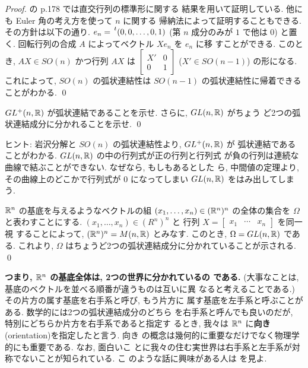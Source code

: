 \documentclass[12pt,twoside]{jarticle}
\begin{document}
\begin{proof}
\cite{Satake} の p.178 では直交行列の標準形に関する
結果を用いて証明している. 他にも Euler 角の考え方を使って $n$ に関する
帰納法によって証明することもできる. その方針は以下の通り. %
$e_n = \transpose(0,0,\dots,0,1)$ (第 $n$ 成分のみが $1$ で他は $0$)
と置く. 回転行列の合成 $A$ によってベクトル $X e_n$ を $e_n$ に移
すことができる. このとき, $AX \in SO(n)$ かつ行列 $AX$ は %
\(\displaystyle \begin{bmatrix}X'&0\\0&1\end{bmatrix} \) %
($X' \in SO(n-1)$) の形になる. これによって, $SO(n)$ の弧状連結性は %
$SO(n-1)$ の弧状連結性に帰着できることがわかる.
\qed
\end{proof}

\begin{question}
  $GL^+(n,{\mathbb R})$ が弧状連結であることを示せ. さらに, $GL(n,{\mathbb R})$ がちょう
  ど2つの弧状連結成分に分かれることを示せ. \qed
\end{question}

\noindent ヒント: 岩沢分解と $SO(n)$ の弧状連結性より, $GL^+(n,{\mathbb R})$ が
弧状連結であることがわかる. $GL(n,{\mathbb R})$ の中の行列式が正の行列と行列式
が負の行列は連続な曲線で結ぶことができない. なぜなら, もしもあるとした
ら, 中間値の定理より, その曲線上のどこかで行列式が 0 になってしまい 
$GL(n,{\mathbb R})$ をはみ出してしまう.

\begin{question}
  ${\mathbb R}^n$ の基底を与えるようなベクトルの組 $(x_1,\dots,x_n)\in ({\mathbb R}^n)^n$ %
  の全体の集合を $\Omega$ と表わすことにする. %
  $(x_1,\dots,x_n)\in (R^n)^n$ と%
  行列 $X = \begin{bmatrix} x_1 & \cdots & x_n \end{bmatrix}$ を同一視
  することによって, $({\mathbb R}^n)^n = M(n,{\mathbb R})$ とみなす. %
  このとき, $\Omega = GL(n,{\mathbb R})$ である. これより, 
  $\Omega$ はちょうど2つの弧状連結成分に分かれていることが示される. \qed
\end{question}

\begin{rem}
{\bf つまり, ${\mathbb R}^n$ の基底全体は, 2つの世界に分かれているの
である.} (大事なことは, 基底のベクトルを並べる順番が違うものは互いに異
なると考えることである.) その片方の属す基底を右手系と呼び, もう片方に
属す基底を左手系と呼ぶことがある. 数学的には2つの弧状連結成分のどちら
を右手系と呼んでも良いのだが, 特別にどちらか片方を右手系であると指定す
るとき, 我々は ${\mathbb R}^n$ に{\bf 向き}(orientation)を指定したと言う. 向き
の概念は幾何的に重要なだけでなく物理学的にも重要である. なお, 面白いこ
とに我々の住む実世界は右手系と左手系が対称でないことが知られている. こ
のような話に興味がある人は \cite{Gardner} を見よ.
\end{rem}
\end{document}
